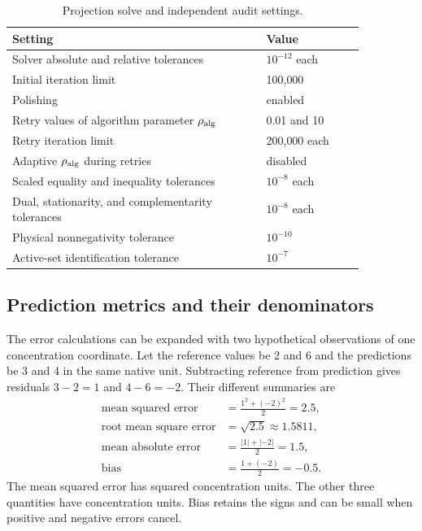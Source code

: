 \begin{table}[htbp]
\centering\small
\caption{Projection solve and independent audit settings.}
\label{tab:plant_projection_settings}
\begin{tabular}{p{0.62\linewidth}p{0.24\linewidth}}
\toprule Setting & Value\\\midrule
Solver absolute and relative tolerances & $10^{-12}$ each\\
Initial iteration limit & 100{,}000\\
Polishing & enabled\\
Retry values of algorithm parameter $\rho_{\rm alg}$ & 0.01 and 10\\
Retry iteration limit & 200{,}000 each\\
Adaptive $\rho_{\rm alg}$ during retries & disabled\\
Scaled equality and inequality tolerances & $10^{-8}$ each\\
Dual, stationarity, and complementarity tolerances & $10^{-8}$ each\\
Physical nonnegativity tolerance & $10^{-10}$\\
Active-set identification tolerance & $10^{-7}$\\
\bottomrule
\end{tabular}
\end{table}

\subsection{Prediction metrics and their denominators}

The error calculations can be expanded with two hypothetical observations of one concentration coordinate. Let the reference values be 2 and 6 and the predictions be 3 and 4 in the same native unit. Subtracting reference from prediction gives residuals $3-2=1$ and $4-6=-2$. Their different summaries are
\[
\begin{aligned}
\text{mean squared error}&=\frac{1^2+(-2)^2}{2}=2.5,\\
\text{root mean square error}&=\sqrt{2.5}\approx1.5811,\\
\text{mean absolute error}&=\frac{|1|+|-2|}{2}=1.5,\\
\text{bias}&=\frac{1+(-2)}{2}=-0.5.
\end{aligned}
\]
The mean squared error has squared concentration units. The other three quantities have concentration units. Bias retains the signs and can be small when positive and negative errors cancel.

